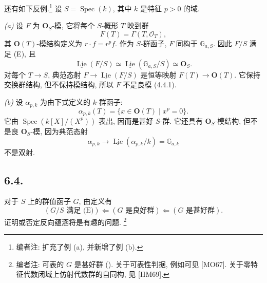 还有如下反例.\footnote{编者注: 扩充了例 (a), 并新增了例 (b).} 设 \(S=\operatorname{Spec}(k)\), 其中 \(k\) 是特征
\(p>0\) 的域.

\medskip
\noindent\textit{(a)}
设 \(F\) 为 \(\mathbf O_S\)-模, 它将每个 \(S\)-概形
\(T\) 映到群
\[
 F(T)=\Gamma(T,\mathscr O_T),
\]
其 \(\mathbf O(T)\)-模结构定义为
\(r\cdot f=r^pf\). 作为 \(S\)-群函子, \(F\) 同构于
\(\mathbb G_{a,S}\). 因此 \(F/S\) 满足 (E), 且
\[
 \underline{\operatorname{Lie}}(F/S)
 \simeq
 \underline{\operatorname{Lie}}(\mathbb G_{a,S}/S)
 \simeq\mathbf O_S.
\]
对每个 \(T\to S\), 典范态射
\(F\to\underline{\operatorname{Lie}}(F/S)\) 是恒等映射
\(F(T)\to\mathbf O(T)\). 它保持交换群结构, 但不保持模结构,
所以 \(F\) 不是良模 (4.4.1).

\medskip
\noindent\textit{(b)}
设 \(\alpha_{p,k}\) 为由下式定义的 \(k\)-群函子:
\[
 \alpha_{p,k}(T)=\{x\in\mathbf O(T)\mid x^p=0\}.
\]
它由 \(\operatorname{Spec}(k[X]/(X^p))\) 表出,
因而是甚好 \(S\)-群. 它还具有 \(\mathbf O_S\)-模结构,
但不是良 \(\mathbf O_S\)-模, 因为典范态射
\[
 \alpha_{p,k}\longrightarrow
 \underline{\operatorname{Lie}}(\alpha_{p,k}/k)=\mathbb G_{a,k}
\]
不是双射.

\subsection*{6.4.}
对于 \(S\) 上的群值函子 \(G\), 由定义有
\[
 (G/S\text{ 满足 (E)})
 \Longleftarrow(G\text{ 是良好群})
 \Longleftarrow(G\text{ 是甚好群}).
\]
证明或否定反向蕴涵将是有趣的问题.
\footnote{编者注: 可表的 \(G\) 是甚好群 ().
关于可表性判据, 例如可见 [MO67]. 关于零特征代数闭域上仿射代数群的自同构,
见 [HM69].}

